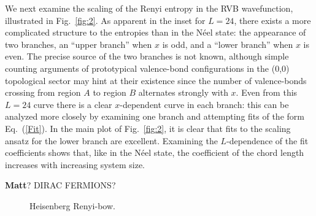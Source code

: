 \documentclass[prl,aps,twocolumn,floatfix,amsmath,amssymb,superscriptaddress,tightenlines]{revtex4}
\begin{document}
We next examine the scaling of the Renyi entropy in the RVB wavefunction, illustrated in Fig.~{\ref{fig:2}}.  As apparent in the inset for $L=24$, there exists a more complicated structure to the entropies than in the N\'eel state: the appearance of two branches, an ``upper branch'' when $x$ is odd, and a ``lower branch'' when $x$ is even.  The precise source of the two branches is not known, although simple counting arguments of prototypical valence-bond configurations in the (0,0) topological sector may hint at their existence since the number of valence-bonds crossing from region $A$ to region $B$ alternates strongly with $x$.  Even from this $L=24$ curve there is a clear $x$-dependent curve in each branch: this can be analyzed more closely by examining one branch and attempting fits of the form Eq.~(\ref{Fit}).  In the main plot of Fig.~{\ref{fig:2}}, it is clear that fits to the scaling ansatz for the lower branch are excellent.  Examining the $L$-dependence of the fit coefficients shows that, like in the N\'eel state, the coefficient of the chord length increases with increasing system size.

{\bf Matt}? DIRAC FERMIONS?

 \begin{figure}[ht]
   \begin{center}
   \end{center}
   \caption{Heisenberg Renyi-bow. }
   \label{fig:1}
 \end{figure}
\end{document}
